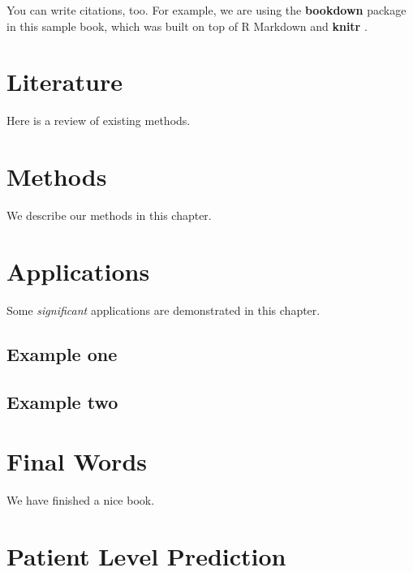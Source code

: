 \documentclass[]{book}
\begin{document}
You can write citations, too. For example, we are using the
\textbf{bookdown} package \citep{R-bookdown} in this sample book, which
was built on top of R Markdown and \textbf{knitr} \citep{xie2015}.

\chapter{Literature}\label{literature}

Here is a review of existing methods.

\chapter{Methods}\label{methods}

We describe our methods in this chapter.

\chapter{Applications}\label{applications}

Some \emph{significant} applications are demonstrated in this chapter.

\section{Example one}\label{example-one}

\section{Example two}\label{example-two}

\chapter{Final Words}\label{final-words}

We have finished a nice book.

\chapter{Patient Level Prediction}\label{patientlevelprediction}
\end{document}
